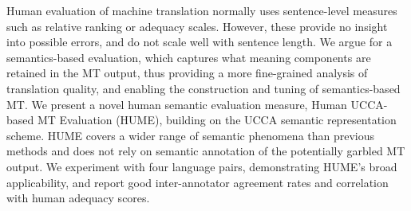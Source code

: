 Human evaluation of machine translation normally uses sentence-level measures such as relative ranking or adequacy scales. However, these provide no insight into possible errors, and do not scale well with sentence length. We argue for a semantics-based evaluation, which captures what meaning components are retained in the MT output, thus providing a more fine-grained analysis of translation quality, and enabling the construction and tuning of semantics-based MT. We present a novel human semantic evaluation measure, Human UCCA-based MT Evaluation (HUME), building on the UCCA semantic representation scheme. HUME covers a wider range of semantic phenomena than previous methods and does not rely on semantic annotation of the potentially garbled MT output. We experiment with four language pairs, demonstrating HUME's broad applicability, and report good inter-annotator agreement rates and correlation with human adequacy scores.
